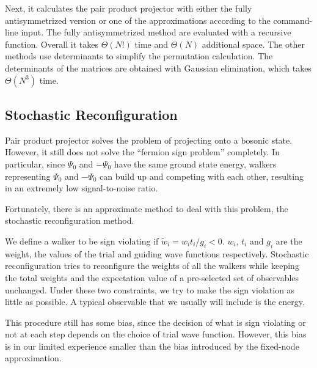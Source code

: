 \documentclass[%
reprint,
nofootinbib,
amsmath,amssymb,
aps,
prl,
]{revtex4-1}
\begin{document}
Next, it calculates the pair product projector with either the fully antisymmetrized version or one of the approximations according to the command-line input.
The fully antisymmetrized method are evaluated with a recursive function.
Overall it takes $\Theta(N!)$ time and $\Theta(N)$ additional space.
The other methods use determinants to simplify the permutation calculation.
The determinants of the matrices are obtained with Gaussian elimination, which takes $\Theta(N^3)$ time.

\subsection{Stochastic Reconfiguration}

Pair product projector solves the problem of projecting onto a bosonic state.
However, it still does not solve the ``fermion sign problem'' completely.
In particular, since $\Psi_0$ and $-\Psi_0$ have the same ground state energy, walkers representing $\Psi_0$ and $-\Psi_0$ can build up and competing with each other, resulting in an extremely low signal-to-noise ratio.

Fortunately, there is an approximate method to deal with this problem, the stochastic reconfiguration method.

We define a walker to be sign violating if $\widetilde{w}_i = w_it_i/g_i < 0$.
$w_i$, $t_i$ and $g_i$ are the weight, the values of the trial and guiding wave functions respectively.
Stochastic reconfiguration tries to reconfigure the weights of all the walkers while keeping the total weights and the expectation value of a pre-selected set of observables unchanged.
Under these two constraints, we try to make the sign violation as little as possible.
A typical observable that we usually will include is the energy.

This procedure still has some bias, since the decision of what is sign violating or not at each step depends on the choice of trial wave function.
However, this bias is in our limited experience smaller than the bias introduced by the fixed-node approximation.


%
\end{document}
